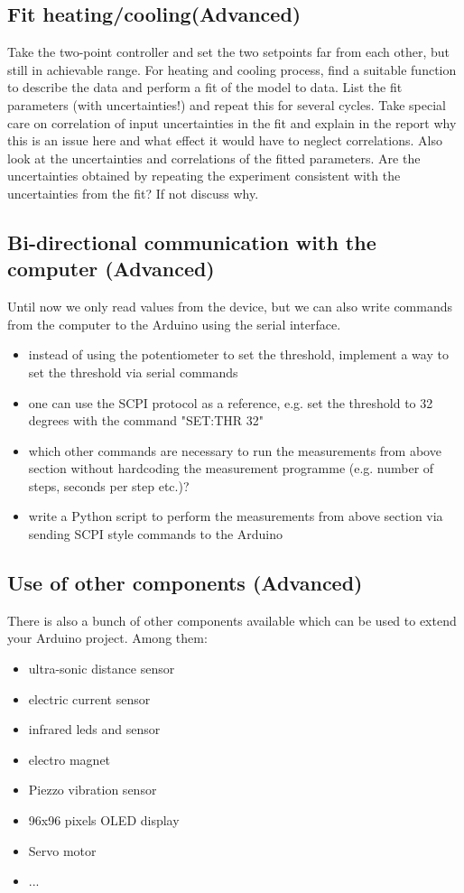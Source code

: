 \subsection{Fit heating/cooling(Advanced)}
Take the two-point controller and set the two setpoints far from each other, but still in achievable range. For heating and cooling process, find a suitable function to describe the data and perform a fit of the model to data. List the fit parameters (with uncertainties!) and repeat this for several cycles. Take special care on correlation of input uncertainties in the fit and explain in the report why this is an issue here and what effect it would have to neglect correlations. Also look at the uncertainties and correlations of the fitted parameters.
Are the uncertainties obtained by repeating the experiment consistent with the uncertainties from the fit? If not discuss why.

\subsection{Bi-directional communication with the computer (Advanced)}\label{sec:bi}
Until now we only read values from the device, but we can also write commands from the computer to the Arduino using the serial interface.
\begin{itemize}
	\item instead of using the potentiometer to set the threshold, implement a way to set the threshold via serial commands
	\item one can use the SCPI protocol as a reference, e.g. set the threshold to 32 degrees with the command "SET:THR 32"
	\item which other commands are necessary to run the measurements from above section without hardcoding the measurement programme (e.g. number of steps, seconds per step etc.)?
	\item write a Python script to perform the measurements from above section via sending SCPI style commands to the Arduino
\end{itemize}


\subsection{Use of other components (Advanced)}
There is also a bunch of other components available which can be used to extend your Arduino project. Among them:
\begin{itemize}
	\item ultra-sonic distance sensor
	\item electric current sensor
	\item infrared leds and sensor
	\item electro magnet
	\item Piezzo vibration sensor
	\item 96x96 pixels OLED display
	\item Servo motor
	\item ...
\end{itemize}

